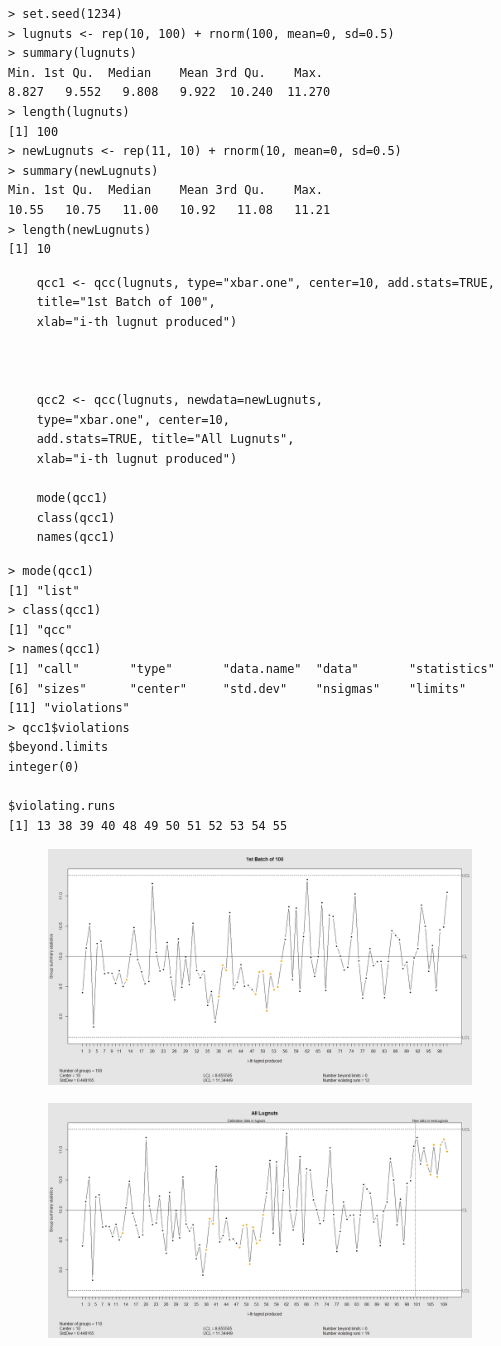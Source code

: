 \documentclass[MASTER-SPC.tex]{subfiles}
\begin{document}
\begin{verbatim}
> set.seed(1234)
> lugnuts <- rep(10, 100) + rnorm(100, mean=0, sd=0.5)
> summary(lugnuts)
Min. 1st Qu.  Median    Mean 3rd Qu.    Max. 
8.827   9.552   9.808   9.922  10.240  11.270 
> length(lugnuts)
[1] 100
> newLugnuts <- rep(11, 10) + rnorm(10, mean=0, sd=0.5)
> summary(newLugnuts)
Min. 1st Qu.  Median    Mean 3rd Qu.    Max. 
10.55   10.75   11.00   10.92   11.08   11.21 
> length(newLugnuts)
[1] 10
\end{verbatim}

\begin{framed}
	\begin{verbatim}
	qcc1 <- qcc(lugnuts, type="xbar.one", center=10, add.stats=TRUE,
	title="1st Batch of 100", 
	xlab="i-th lugnut produced")
	
	
	
	qcc2 <- qcc(lugnuts, newdata=newLugnuts,
	type="xbar.one", center=10, 
	add.stats=TRUE, title="All Lugnuts", 
	xlab="i-th lugnut produced")
	
	mode(qcc1)
	class(qcc1)
	names(qcc1)
	\end{verbatim}
\end{framed}

\begin{verbatim}
> mode(qcc1)
[1] "list"
> class(qcc1)
[1] "qcc"
> names(qcc1)
[1] "call"       "type"       "data.name"  "data"       "statistics"
[6] "sizes"      "center"     "std.dev"    "nsigmas"    "limits"    
[11] "violations"
> qcc1$violations
$beyond.limits
integer(0)

$violating.runs
[1] 13 38 39 40 48 49 50 51 52 53 54 55
\end{verbatim}

\newpage
\begin{figure}[h!]
	\centering
	\includegraphics[width=0.8\linewidth]{images/lugnuts1}
	\caption{}
	\label{fig:lugnuts1}
\end{figure}
\begin{figure}[h!]
	\centering
	\includegraphics[width=0.8\linewidth]{images/lugnuts2}
	\caption{}
	\label{fig:lugnuts2}
\end{figure}
\newpage
\end{document}
